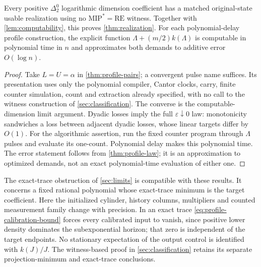 \begin{corollary}\label{cor:profile-no-witness}
Every positive $\Delta^0_2$ logarithmic dimension coefficient has a matched original-state usable realization using no $\mathrm{MIP}^*=\mathrm{RE}$ witness. Together with \cref{lem:computability}, this proves \cref{thm:realization}. For each polynomial-delay profile construction, the explicit function $\Lambda+(m/2)k(\Lambda)$ is computable in polynomial time in $n$ and approximates both demands to additive error $O(\log n)$.
\end{corollary}
\begin{proof}
Take $L=U=\alpha$ in \cref{thm:profile-pairs}; a convergent pulse name suffices. Its presentation uses only the polynomial compiler, Cantor clocks, carry, finite counter simulation, count and extraction already specified, with no call to the witness construction of \cref{sec:classification}. The converse is the computable-dimension limit argument. Dyadic losses imply the full $\varepsilon\downarrow0$ law: monotonicity sandwiches a loss between adjacent dyadic losses, whose linear targets differ by $O(1)$.
For the algorithmic assertion, run the fixed counter program through $\Lambda$ pulses and evaluate its one-count. Polynomial delay makes this polynomial time. The error statement follows from \cref{thm:profile-law}; it is an approximation to optimized demands, not an exact polynomial-time evaluation of either one.
\end{proof}

The exact-trace obstruction of \cref{sec:limits} is compatible with these results. It concerns a fixed rational polynomial whose exact-trace minimum is the target coefficient. Here the initialized cylinder, history columns, multipliers and counted measurement family change with precision. In an exact trace \eqref{eq:profile-calibration-bound} forces every calibrated input to vanish, since positive lower density dominates the subexponential horizon; that zero is independent of the target endpoints. No stationary expectation of the output control is identified with $k(J)/J$. The witness-based proof in \cref{sec:classification} retains its separate projection-minimum and exact-trace conclusions.

